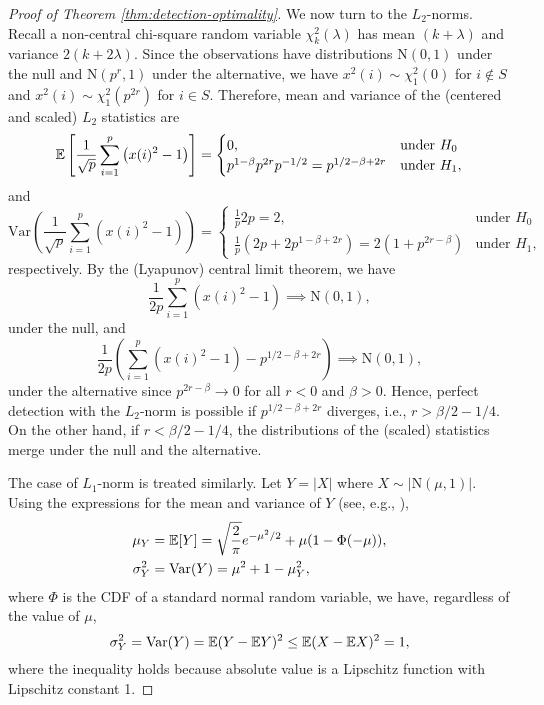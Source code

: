 \begin{proof}[Proof of Theorem \ref{thm:detection-optimality}]
We now turn to the $L_2$-norms.
Recall a non-central chi-square random variable $\chi^2_k(\lambda)$ has mean $(k+\lambda)$ and variance $2(k+2\lambda)$.
Since the observations have distributions $\mathrm{N}(0,1)$ under the null and $\mathrm{N}(p^r,1)$ under the alternative, we have $x^2(i)\sim \chi^2_1(0)$ for $i\not\in S$ and $x^2(i)\sim \chi^2_1(p^{2r})$ for $i\in S$.
Therefore, mean and variance of the (centered and scaled) $L_2$ statistics are
\begin{equation}
    {\mathbb E}\left[\frac{1}{\sqrt{p}}\sum_{i=1}^p \left(x(i)^2-1\right)\right] = 
    \begin{cases}
    0, & \text{under } H_0\\
    p^{1-\beta}p^{2r}p^{-1/2} = p^{1/2-\beta+2r} & \text{under } H_1,
    \end{cases}
\end{equation}
and 
\begin{equation}
    \mathrm{Var}\left(\frac{1}{\sqrt{p}}\sum_{i=1}^p \left(x(i)^2-1\right)\right) = 
    \begin{cases}
    \frac{1}{p}2p = 2, & \text{under } H_0\\
    \frac{1}{p}\left(2p+2p^{1-\beta+2r}\right) = 2(1+p^{2r-\beta}) & \text{under } H_1,
    \end{cases}
\end{equation}
respectively.
By the (Lyapunov) central limit theorem, we have
\begin{equation}
    \frac{1}{2p}\sum_{i=1}^p \left(x(i)^2-1\right) \implies \mathrm{N}(0,1),
\end{equation}
under the null, and
\begin{equation}
    \frac{1}{2p}\left(\sum_{i=1}^p \left(x(i)^2-1\right) - p^{1/2-\beta+2r}\right) \implies \mathrm{N}(0,1),
\end{equation}
under the alternative since $p^{2r-\beta}\to0$ for all $r<0$ and $\beta>0$.
Hence, perfect detection with the $L_2$-norm is possible if $p^{1/2-\beta+2r}$ diverges, i.e., $r>\beta/2-1/4$.
On the other hand, if $r<\beta/2-1/4$, the distributions of the (scaled) statistics merge under the null and the alternative. %

The case of $L_1$-norm is treated similarly.
Let $Y=|X|$ where $X\sim|\mathrm{N}(\mu,1)|$. 
Using the expressions for the mean and variance of $Y$ (see, e.g., \cite{tsagris2014folded}),
\begin{align}
    \mu_Y &= {\mathbb E}[Y] = \sqrt{\frac{2}{\pi}}e^{-\mu^2/2} + \mu(1-\Phi(-\mu)), \\
    \sigma_Y^2 &= \mathrm{Var}(Y) = \mu^2 + 1 - \mu^2_Y,
\end{align}
where $\Phi$ is the CDF of a standard normal random variable,
we have, regardless of the value of $\mu$,
\begin{equation} \label{eq:bounded-variance-abs-Gaussian}
    \sigma_Y^2 = \mathrm{Var}(Y) = {\mathbb E}(Y-{\mathbb E} Y)^2 \le {\mathbb E}(X-{\mathbb E} X)^2 = 1,
\end{equation}
where the inequality holds because absolute value is a Lipschitz function with Lipschitz constant 1.


\end{proof}
